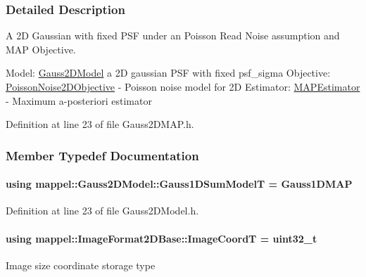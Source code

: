 \subsubsection{Detailed Description}
A 2D Gaussian with fixed P\+SF under an Poisson Read Noise assumption and M\+AP Objective. 

Model\+: \hyperlink{classmappel_1_1Gauss2DModel}{Gauss2\+D\+Model} a 2D gaussian P\+SF with fixed psf\+\_\+sigma Objective\+: \hyperlink{classmappel_1_1PoissonNoise2DObjective}{Poisson\+Noise2\+D\+Objective} -\/ Poisson noise model for 2D Estimator\+: \hyperlink{classmappel_1_1MAPEstimator}{M\+A\+P\+Estimator} -\/ Maximum a-\/posteriori estimator 

Definition at line 23 of file Gauss2\+D\+M\+A\+P.\+h.



\subsubsection{Member Typedef Documentation}
\paragraph[{\texorpdfstring{Gauss1\+D\+Sum\+ModelT}{Gauss1DSumModelT}}]{\setlength{\rightskip}{0pt plus 5cm}using {\bf mappel\+::\+Gauss2\+D\+Model\+::\+Gauss1\+D\+Sum\+ModelT} =  {\bf Gauss1\+D\+M\+AP}\hspace{0.3cm}{\ttfamily [inherited]}}\hypertarget{classmappel_1_1Gauss2DModel_a6e41ec1749814a91648caf394edd4385}{}\label{classmappel_1_1Gauss2DModel_a6e41ec1749814a91648caf394edd4385}


Definition at line 23 of file Gauss2\+D\+Model.\+h.

\paragraph[{\texorpdfstring{Image\+CoordT}{ImageCoordT}}]{\setlength{\rightskip}{0pt plus 5cm}using {\bf mappel\+::\+Image\+Format2\+D\+Base\+::\+Image\+CoordT} =  uint32\+\_\+t\hspace{0.3cm}{\ttfamily [inherited]}}\hypertarget{classmappel_1_1ImageFormat2DBase_a45e9234d63c357f34ca56c72c12b9e9c}{}\label{classmappel_1_1ImageFormat2DBase_a45e9234d63c357f34ca56c72c12b9e9c}
Image size coordinate storage type 

